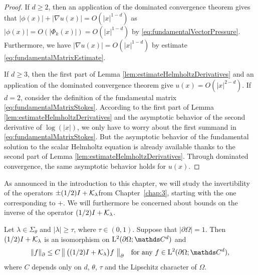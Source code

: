 \begin{proof}
  If $d \geq 2$, then an application of the dominated convergence theorem gives that $|\phi(x)| + |\nabla u(x)| = O(|x|^{1 - d})$ as $|\phi(x)| = O(|\Phi_k(x)|) = O(|x|^{1 - d})$ by \eqref{eq:fundamentalVectorPressure}.
 Furthermore, we have $|\nabla u(x)| = O(|x|^{1 - d})$ by estimate \eqref{eq:fundamentalMatrixEstimate}.

  If $d \geq 3$, then the first part of Lemma \ref{lem:estimateHelmholtzDerivatives} and an application of the dominated convergence theorem give $u(x) = O(|x|^{2 - d})$.
  If $d = 2$, consider the definition of the fundamental matrix \eqref{eq:fundamentalMatrixStokes}. According to the first part of Lemma \ref{lem:estimateHelmholtzDerivatives} and the asymptotic behavior of the second derivative of $\log(|x|)$, we only have to worry about the first summand in \eqref{eq:fundamentalMatrixStokes}. 
  But the asymptotic behavior of the fundamental solution to the scalar Helmholtz equation is already available thanks to the second part of Lemma \ref{lem:estimateHelmholtzDerivatives}. 
  Through dominated convergence, the same asymptotic behavior holds for $u(x)$.
\end{proof}

As announced in the introduction to this chapter, we will study the invertibility of the operators $\pm(1/2) I + \mathcal{K}_\lambda$from Chapter~\ref{chap:3}, starting with the one corresponding to $+$.
We will furthermore be concerned about bounds on the inverse of the operator $(1/2) I + \mathcal{K}_\lambda$.

\begin{lem}
  \label{lem:inverseEstimate1}
  Let $\lambda \in \Sigma_\theta$ and $|\lambda| \geq \tau$, where $\tau \in (0,1)$.
  Suppose that $|\partial\Omega| = 1$.
  Then $(1/2)I + \mathcal{K}_\lambda$ is an isomorphism on $\Ell^2(\partial\Omega; \C^d)$ and
  \begin{align}
    \label{eq:inverseEstimate}
    \| f\|^{}_\partial \leq C \, \big\|\, \big( (1/2) I + \K_\lambda \big) f\, \, \big\|^{}_\partial \quad\text{for any } f \in \Ell^2(\partial\Omega; \C^d),
  \end{align}
  where $C$ depends only on $d$, $\theta$, $\tau$ and the Lipschitz character of $\Omega$.
\end{lem}

